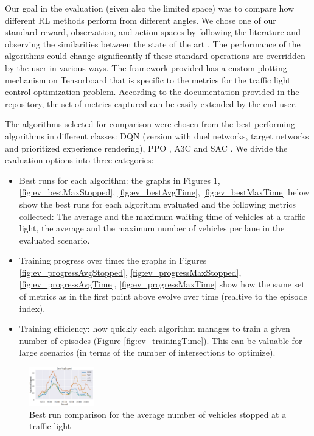 \documentclass[a4paper,twoside]{article}
\begin{document}
Our goal in the evaluation (given also the limited space) was to compare how different RL methods perform from different angles. We chose one of our standard reward, observation, and action spaces by following the literature and observing the similarities between the state of the art \cite{LiDa}. The performance of the algorithms could change significantly if these standard operations are overridden by the user in various ways. The framework provided has a custom plotting mechanism on Tensorboard that is specific to the metrics for the traffic light control optimization problem. According to the documentation provided in the repository, the set of metrics captured can be easily extended by the end user.

The algorithms selected for comparison were chosen from the best performing algorithms in different classes: DQN \cite{DQN} (version with duel networks, target networks and prioritized experience rendering), PPO \cite{schulman2017proximal}, A3C \cite{MnBA} and SAC \cite{ SAC }. We divide the evaluation options into three categories:

\begin{itemize}
	\item Best runs for each algorithm: the graphs in Figures \ref{fig:ev_bestAvgStopped}, \ref{fig:ev_bestMaxStopped}, \ref{fig:ev_bestAvgTime}, \ref{fig:ev_bestMaxTime} below show the best runs for each algorithm evaluated and the following metrics collected: The average and the maximum waiting time of vehicles at a traffic light, the average and the maximum number of vehicles per lane in the evaluated scenario.
	\item Training progress over time: the graphs in Figures \ref{fig:ev_progressAvgStopped}, \ref{fig:ev_progressMaxStopped}, \ref{fig:ev_progressAvgTime}, \ref{fig:ev_progressMaxTime} show how the same set of metrics as in the first point above evolve over time (realtive to the episode index).
	\item Training efficiency: how quickly each algorithm manages to train a given number of episodes (Figure \ref{fig:ev_trainingTime}). This can be valuable for large scenarios (in terms of the number of intersections to optimize). 
\end{itemize}


\begin{figure}[!h]
	\includegraphics[width=0.25\textwidth]{ev_bestAvgStopped.png}
	\centering
	\caption{Best run comparison for the average number of vehicles stopped at a traffic light}
	\label{fig:ev_bestAvgStopped}
\end{figure}
\end{document}

